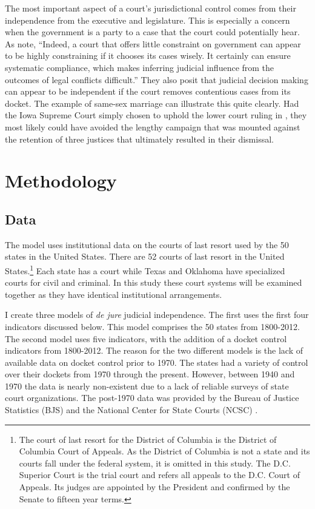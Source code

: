 \documentclass[12pt]{article}
\begin{document}
The most important aspect of a court's jurisdictional control comes from their independence from the executive and legislature.  This is especially a concern when the government is a party to a case that the court could potentially hear.  As \citet[6]{Rios2014} note, ``Indeed, a court that offers little constraint on government can appear to be highly constraining if it chooses its cases wisely. It certainly can ensure systematic compliance, which makes inferring judicial influence from the outcomes of legal conflicts difficult.''  They also posit that judicial decision making can appear to be independent if the court removes contentious cases from its docket.  The example of same-sex marriage can illustrate this quite clearly.  Had the Iowa Supreme Court simply chosen to uphold the lower court ruling in \cite{iowagay}, they most likely could have avoided the lengthy campaign that was mounted against the retention of three justices that ultimately resulted in their dismissal.

\section{Methodology}\label{Methods}
\subsection*{Data}
The model uses institutional data on the courts of last resort used by the 50 states in the United States.  There are 52 courts of last resort in the United States.\footnote{The court of last resort for the District of Columbia is the District of Columbia Court of Appeals.  As the District of Columbia is not a state and its courts fall under the federal system, it is omitted in this study.  The D.C. Superior Court is the trial court and refers all appeals to the D.C. Court of Appeals.  Its judges are appointed by the President and confirmed by the Senate to fifteen year terms.}  Each state has a court while Texas and Oklahoma have specialized courts for civil and criminal.  In this study these court systems will be examined together as they have identical institutional arrangements.  

I create three models of \textit{de jure} judicial independence.  The first uses the first four indicators discussed below.  This model comprises the 50 states from 1800-2012.  The second model uses five indicators, with the addition of a docket control indicators from 1800-2012.  The reason for the two different models is the lack of available data on docket control prior to 1970.  The states had a variety of control over their dockets from 1970 through the present.  However, between 1940 and 1970 the data is nearly non-existent due to a lack of reliable surveys of state court organizations.  The post-1970 data was provided by the Bureau of Justice Statistics (BJS) and the National Center for State Courts (NCSC) \citep{BJS1993,BJS1998,BJS2004}.  
\end{document}
